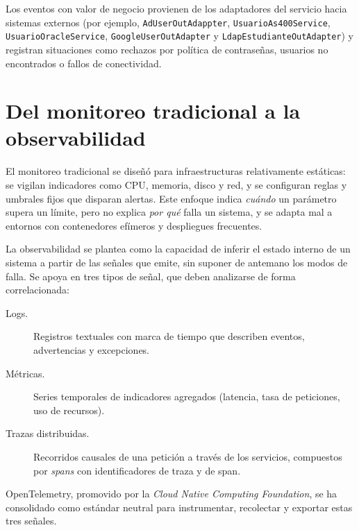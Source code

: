 Los eventos con valor de negocio provienen de los adaptadores del servicio hacia sistemas externos (por ejemplo, \texttt{AdUserOutAdappter}, \texttt{UsuarioAs400Service}, \texttt{UsuarioOracleService}, \texttt{GoogleUserOutAdapter} y \texttt{LdapEstudianteOutAdapter}) y registran situaciones como rechazos por política de contraseñas, usuarios no encontrados o fallos de conectividad. %

\section{Del monitoreo tradicional a la observabilidad}\label{sec:ant_observabilidad}

El monitoreo tradicional se diseñó para infraestructuras relativamente estáticas: se vigilan indicadores como CPU, memoria, disco y red, y se configuran reglas y umbrales fijos que disparan alertas. Este enfoque indica \emph{cuándo} un parámetro supera un límite, pero no explica \emph{por qué} falla un sistema, y se adapta mal a entornos con contenedores efímeros y despliegues frecuentes. %

La observabilidad se plantea como la capacidad de inferir el estado interno de un sistema a partir de las señales que emite, sin suponer de antemano los modos de falla. Se apoya en tres tipos de señal, que deben analizarse de forma correlacionada:

\begin{description}
  \item[Logs.] Registros textuales con marca de tiempo que describen eventos, advertencias y excepciones.
  \item[Métricas.] Series temporales de indicadores agregados (latencia, tasa de peticiones, uso de recursos).
  \item[Trazas distribuidas.] Recorridos causales de una petición a través de los servicios, compuestos por \textit{spans} con identificadores de traza y de span.
\end{description}

OpenTelemetry, promovido por la \textit{Cloud Native Computing Foundation}, se ha consolidado como estándar neutral para instrumentar, recolectar y exportar estas tres señales. %

